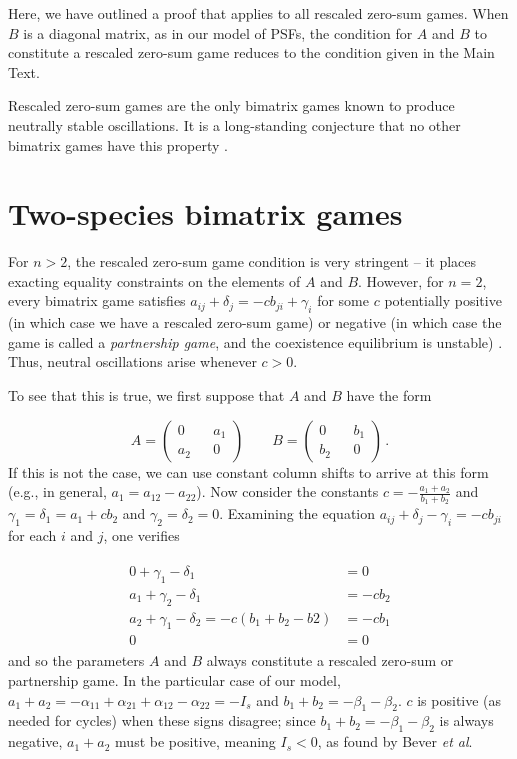 \documentclass[11pt]{article}
\begin{document}
Here, we have outlined a proof that applies to all rescaled zero-sum games. When $B$ is a diagonal matrix, as in our model of PSFs, the condition for $A$ and $B$ to constitute a rescaled zero-sum game reduces to the condition given in the Main Text.

Rescaled zero-sum games are the only bimatrix games known to produce neutrally stable oscillations. It is a long-standing conjecture that no other bimatrix games have this property \citep{hofbauer1996evolutionary,hofbauer1998evolutionary,hofbauer2011deterministic}. 

\section{Two-species bimatrix games}

For $n > 2$, the rescaled zero-sum game condition is very stringent -- it places exacting equality constraints on the elements of $A$ and $B$. However, for $n = 2$, every bimatrix game satisfies $a_{ij} + \delta_j = -c b_{ji} + \gamma_i$ for some $c$ potentially positive (in which case we have a rescaled zero-sum game) or negative (in which case the game is called a \emph{partnership game}, and the coexistence equilibrium is unstable) \citep{hofbauer1998evolutionary}. Thus, neutral oscillations arise whenever $c > 0$. 

To see that this is true, we first suppose that $A$ and $B$ have the form

\begin{equation}
	A = \begin{pmatrix}
	0 && a_1 \\
	a_2 && 0
	\end{pmatrix}
	\quad \quad 
	B = \begin{pmatrix}
	0 && b_1 \\
	b_2 && 0 
	\end{pmatrix} \, . 
\end{equation}
If this is not the case, we can use constant column shifts to arrive at this form (e.g., in general, $a_1 = a_{12} - a_{22}$). Now consider the constants $c = -\frac{a_1 + a_2}{b_1 + b_2}$ and $\gamma_1 = \delta_1 = a_1 + c b_2$ and $\gamma_2 = \delta_2 = 0$. Examining the equation $a_{ij} + \delta_j - \gamma_i = -c b_{ji}$ for each $i$ and $j$, one verifies

\begin{align}
	\begin{split}
	0 + \gamma_1 - \delta_1  &= 0 \\
	a_1 + \gamma_2 - \delta_1 &= -c b_2 \\
	a_2 + \gamma_1 - \delta_2 = -c (b_1 + b_2 - b2) &= -c b_1 \\
	0  &= 0
	\end{split}
\end{align}
and so the parameters $A$ and $B$ always constitute a rescaled zero-sum or partnership game. In the particular case of our model, $a_1 + a_2 = -\alpha_{11} + \alpha_{21} + \alpha_{12} - \alpha_{22} = -I_s$ and $b_1 + b_2 = -\beta_1 - \beta_2$. $c$ is positive (as needed for cycles) when these signs disagree; since $b_1 + b_2 = -\beta_1 - \beta_2$ is always negative, $a_1 + a_2$ must be positive, meaning $I_s < 0$, as found by Bever \textit{et al}.
\end{document}
